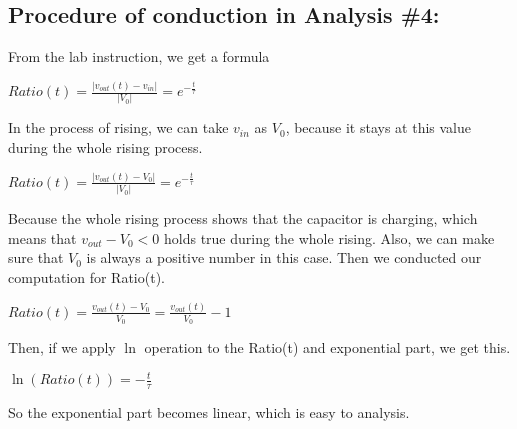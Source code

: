 \hfill \newline
\subsection*{Procedure of conduction in Analysis \#4:} 
\phantom{ } From the lab instruction, we get a formula\\
\begin{center}
	$Ratio(t) = \frac{|v_{out}(t) - v_{in}|}{|V_0|} = e^{-\frac{t}{\tau}}$
\end{center}

\phantom{ } In the process of rising, we can take $v_{in}$ as $V_0$, because it stays at this value during the whole rising process.\\
\begin{center}
$Ratio(t) = \frac{|v_{out}(t) - V_0|}{|V_0|} = e^{-\frac{t}{\tau}}$\\
\end{center}

\phantom{ } Because the whole rising process shows that the capacitor is charging, which means that $v_{out} - V_0 < 0$ holds true during the whole rising. Also, we can make sure that $V_0$ is always a positive number in this case. Then we conducted our 
computation for Ratio(t).\\

\begin{center}
$Ratio(t) = \frac{v_{out}(t) - V_0}{V_0} = \frac{v_{out}(t)}{V_0} - 1$\\
\end{center}

\phantom{ } Then, if we apply $\ln$ operation to the Ratio(t) and exponential part, we get this.\\

\begin{center}
	$\ln(Ratio(t)) = -\frac{t}{\tau}$\\
\end{center}

\phantom{ } So the exponential part becomes linear, which is easy to analysis.\\